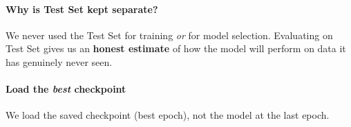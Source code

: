 \documentclass[11pt]{article}
\begin{document}
\paragraph{Why is Test Set kept
separate?}\label{why-is-test-set-kept-separate}

We never used the Test Set for training \emph{or} for model selection.
Evaluating on Test Set gives us an \textbf{honest estimate} of how the
model will perform on data it has genuinely never seen.

\paragraph{\texorpdfstring{Load the \emph{best}
checkpoint}{Load the best checkpoint}}\label{load-the-best-checkpoint}

We load the saved checkpoint (best epoch), not the model at the last
epoch.
\end{document}

